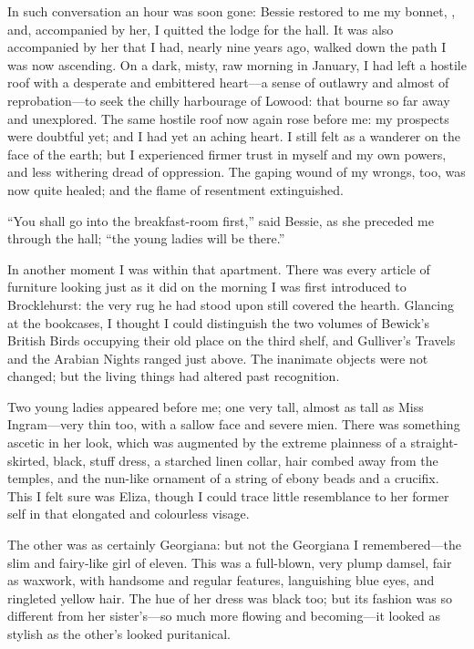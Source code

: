 In such conversation an hour was soon gone: Bessie restored to me my
bonnet, \etc, and, accompanied by her, I quitted the lodge for the
hall. It was also accompanied by her that I had, nearly nine years ago,
walked down the path I was now ascending. On a dark, misty, raw morning
in January, I had left a hostile roof with a desperate and embittered
heart---a sense of outlawry and almost of reprobation---to seek the
chilly harbourage of Lowood: that bourne so far away and unexplored. 
The same hostile roof now again rose before me: my prospects were
doubtful yet; and I had yet an aching heart. I still felt as a wanderer
on the face of the earth; but I experienced firmer trust in myself and
my own powers, and less withering dread of oppression. The gaping wound
of my wrongs, too, was now quite healed; and the flame of resentment
extinguished.

\enquote{You shall go into the breakfast-room first,} said Bessie, as
she preceded me through the hall; \enquote{the young ladies will be
there.}

In another moment I was within that apartment. There was every article
of furniture looking just as it did on the morning I was first
introduced to \Mr{} Brocklehurst: the very rug he had stood upon still
covered the hearth. Glancing at the bookcases, I thought I could
distinguish the two volumes of Bewick's British Birds occupying their
old place on the third shelf, and Gulliver's Travels and the Arabian
Nights ranged just above. The inanimate objects were not changed; but
the living things had altered past recognition.

Two young ladies appeared before me; one very tall, almost as tall as
Miss Ingram---very thin too, with a sallow face and severe mien. There
was something ascetic in her look, which was augmented by the extreme
plainness of a straight-skirted, black, stuff dress, a starched linen
collar, hair combed away from the temples, and the nun-like ornament of
a string of ebony beads and a crucifix. This I felt sure was Eliza,
though I could trace little resemblance to her former self in that
elongated and colourless visage.

The other was as certainly Georgiana: but not the Georgiana I
remembered---the slim and fairy-like girl of eleven. This was a
full-blown, very plump damsel, fair as waxwork, with handsome and
regular features, languishing blue eyes, and ringleted yellow hair. The
hue of her dress was black too; but its fashion was so different from
her sister's---so much more flowing and becoming---it looked as stylish
as the other's looked puritanical.

